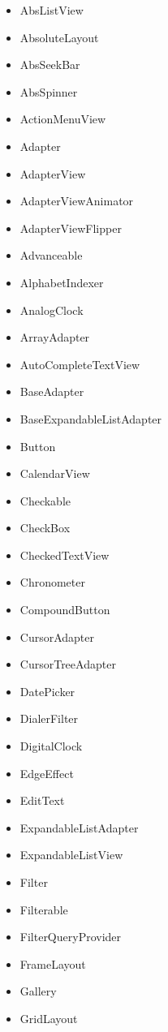 \documentclass[a4paper,14pt]{extarticle} %
\begin{document}
	\begin{itemize}
        \item AbsListView
        \item AbsoluteLayout
        \item AbsSeekBar
        \item AbsSpinner
        \item ActionMenuView
        \item Adapter
        \item AdapterView
        \item AdapterViewAnimator
        \item AdapterViewFlipper
        \item Advanceable
        \item AlphabetIndexer
        \item AnalogClock
        \item ArrayAdapter
        \item AutoCompleteTextView
        \item BaseAdapter
        \item BaseExpandableListAdapter
        \item Button
        \item CalendarView
        \item Checkable
        \item CheckBox
        \item CheckedTextView
        \item Chronometer
        \item CompoundButton
        \item CursorAdapter
        \item CursorTreeAdapter
        \item DatePicker
        \item DialerFilter
        \item DigitalClock
        \item EdgeEffect
        \item EditText
        \item ExpandableListAdapter
        \item ExpandableListView
        \item Filter
        \item Filterable
        \item FilterQueryProvider
        \item FrameLayout
        \item Gallery
        \item GridLayout

\end{itemize}
\end{document}
